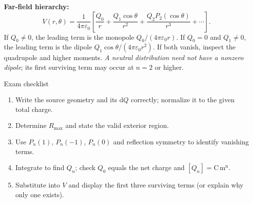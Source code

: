 \documentclass[10pt,letterpaper]{article}
\newcommand{\eps}{\varepsilon_0}\newcommand{\dd}{\mathrm d}
\begin{document}
\textbf{Far-field hierarchy:}
\[V(r,\theta)=\frac{1}{4\pi\eps}\left[\frac{Q_0}{r}+\frac{Q_1\cos\theta}{r^2}+\frac{Q_2P_2(\cos\theta)}{r^3}+\cdots\right].\]
If $Q_0\ne0$, the leading term is the monopole $Q_0/(4\pi\eps r)$. If $Q_0=0$ and $Q_1\ne0$, the leading term is the dipole $Q_1\cos\theta/(4\pi\eps r^2)$. If both vanish, inspect the quadrupole and higher moments. \emph{A neutral distribution need not have a nonzero dipole}; its first surviving term may occur at $n=2$ or higher.
\begin{result}{Exam checklist}
\begin{enumerate}[leftmargin=*,itemsep=2pt]
\item Write the source geometry and its $\dd Q$ correctly; normalize it to the given total charge.
\item Determine $R_{\max}$ and state the valid exterior region.
\item Use $P_n(1)$, $P_n(-1)$, $P_n(0)$ and reflection symmetry to identify vanishing terms.
\item Integrate to find $Q_n$; check $Q_0$ equals the net charge and $[Q_n]=\mathrm{C\,m^n}$.
\item Substitute into $V$ and display the first three surviving terms (or explain why only one exists).
\end{enumerate}
\end{result}
\end{document}
